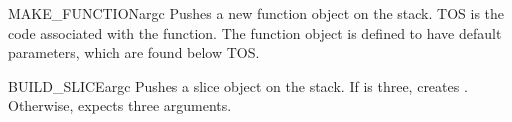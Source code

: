 \begin{opcodedesc}{MAKE_FUNCTION}{argc}
Pushes a new function object on the stack.  TOS is the code associated
with the function.  The function object is defined to have 
default parameters, which are found below TOS.
\end{opcodedesc}

\begin{opcodedesc}{BUILD_SLICE}{argc}
Pushes a slice object on the stack.  If  is three, creates
.  Otherwise, expects three arguments.
\end{opcodedesc}


